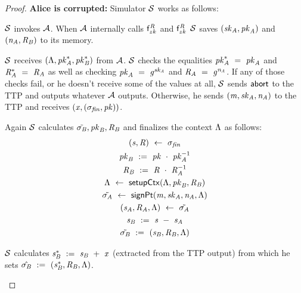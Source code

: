 \begin{proof}
    \textbf{Alice is corrupted: } Simulator $\mathcal{S}$ works as follows:
    \begin{asparaenum}
        \item $\mathcal{S}$ invokes $\mathcal{A}$.
        When $\mathcal{A}$ internally calls $\mathsf{f}^{\mathit{R}}_{zk}$ and $\mathsf{f}^{\mathit{R}}_{zk}$ $\mathcal{S}$ saves $(\mathit{sk}_{\mathit{A}}, \mathit{pk}_{\mathit{A}})$ and $(\mathit{\mathit{n}_{\mathit{A}}}, \mathit{R}_{\mathit{B}})$ to its memory.
        \item $\mathcal{S}$ receives $(\Lambda, \mathit{pk}_{\mathit{A}}^*, \mathit{pk}_{\mathit{B}}^*)$ from $\mathcal{A}$.
        $\mathcal{S}$ checks the equalities $\mathit{pk}_{\mathit{A}}^* ~=~ \mathit{pk}_{\mathit{A}}$ and $\mathit{R}_{\mathit{A}}^* ~=~ \mathit{R}_{\mathit{A}}$ as well as checking $\mathit{pk}_{\mathit{A}} ~=~ \mathit{g}^{\mathit{sk}_{\mathit{A}}}$ and $\mathit{R}_{\mathit{A}} ~=~ \mathit{g}^{\mathit{\mathit{n}_{\mathit{A}}}}$.
        If any of those checks fail, or he doesn't receive some of the values at all, $\mathcal{S}$ sends $\mathsf{abort}$ to the TTP and outputs whatever $\mathcal{A}$ outputs.
        Otherwise, he sends $(\mathit{m}, \mathit{sk}_{\mathit{A}}, \mathit{\mathit{n}_{\mathit{A}}})$ to the TTP and receives $(\mathit{x}, (\sigma_{\mathit{fin}}, \mathit{pk}))$.
        \item Again $\mathcal{S}$ calculates $\tilde{\sigma_{\mathit{B}}}, \mathit{pk}_{\mathit{B}}, \mathit{R}_{\mathit{B}}$ and finalizes the context $\Lambda$ as follows:
        \begin{gather*}
            (\mathit{s}, \mathit{R}) ~\leftarrow~ \sigma_{\mathit{fin}} \\
            \mathit{pk}_{\mathit{B}} ~:=~ \mathit{pk} ~\cdot~ \mathit{pk}_{\mathit{A}}^{-1} \\
            \mathit{R}_{\mathit{B}} ~:=~ \mathit{R} ~\cdot~ \mathit{R}_{\mathit{A}}^{-1} \\
            \Lambda ~\leftarrow~ \mathsf{setupCtx}( \Lambda, \mathit{pk}_{\mathit{B}}, \mathit{R}_{\mathit{B}} ) \\
            \tilde{\sigma_{\mathit{A}}} ~\leftarrow~ \mathsf{signPt}(\mathit{m}, \mathit{sk}_{\mathit{A}}, \mathit{\mathit{n}_{\mathit{A}}}, \Lambda) \\
            (\mathit{s}_{\mathit{A}}, \mathit{R}_{\mathit{A}}, \Lambda) ~\leftarrow~ \tilde{\sigma_{\mathit{A}}} \\
            \mathit{s}_{\mathit{B}} ~:=~ \mathit{s} ~-~ \mathit{s}_{\mathit{A}} \\
            \tilde{\sigma_{\mathit{B}}} ~:=~ (\mathit{s}_{\mathit{B}}, \mathit{R}_{\mathit{B}}, \Lambda)
        \end{gather*}
        \item $\mathcal{S}$ calculates $\mathit{s}_{\mathit{B}}^* ~:=~ \mathit{s}_{\mathit{B}} ~+~ \mathit{x}$ (extracted from the TTP output) from which he sets $\hat{\sigma_{\mathit{B}}} ~:=~ (\mathit{s}_{\mathit{B}}^*, \mathit{R}_{\mathit{B}}, \Lambda)$.

\end{asparaenum}
\end{proof}
